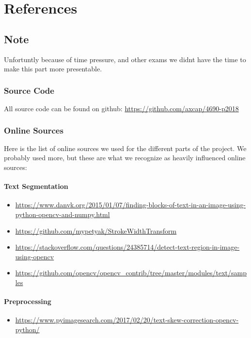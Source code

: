 \documentclass[Report.tex]{subfiles}
\begin{document}
\chapter{References}
\label{chap:References}
\section{Note}
Unfortuntly because of time pressure, and other exams we didnt have the time to make this part more presentable. \\ 

\subsection{Source Code}
All source code can be found on github: \url{https://github.com/axcap/4690-p2018} \\

\subsection{Online Sources}
Here is the list of online sources we used for the different parts of the project. We probably used more, but these are what we recognize as heavily influenced online sources:

\subsubsection{Text Segmentation}
\begin{itemize}
    \item \url{https://www.danvk.org/2015/01/07/finding-blocks-of-text-in-an-image-using-python-opencv-and-numpy.html}
    \item \url{https://github.com/mypetyak/StrokeWidthTransform}
    \item \url{https://stackoverflow.com/questions/24385714/detect-text-region-in-image-using-opencv}
    \item \url{https://github.com/opencv/opencv_contrib/tree/master/modules/text/samples}
\end{itemize}
\subsubsection{Preprocessing}
\begin{itemize}
    \item \url{https://www.pyimagesearch.com/2017/02/20/text-skew-correction-opencv-python/}
\end{itemize}
\end{document}
